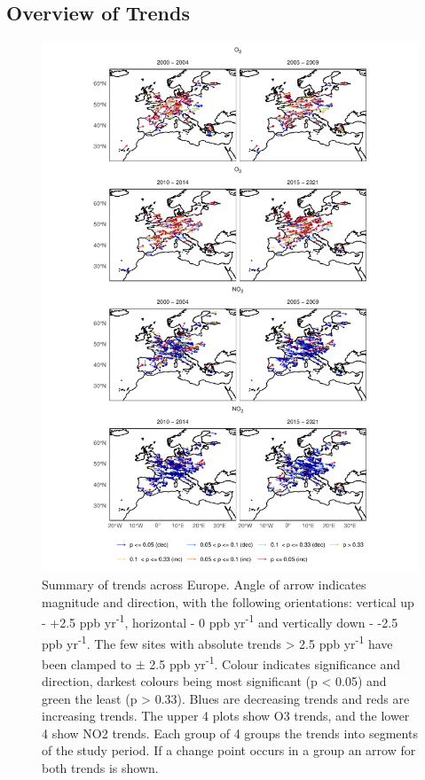 \documentclass[journal abbreviation, manuscript]{copernicus}
\begin{document}
\subsection{Overview of Trends} \label{sect:overview_of_trends}
\begin{figure}[p]
\includegraphics[width=12cm]{figures/f3_eu_arrows.pdf}
\caption{Summary of trends across Europe. Angle of arrow indicates magnitude and direction, with the following orientations: vertical up - +2.5 ppb yr\textsuperscript{-1}, horizontal - 0 ppb yr\textsuperscript{-1} and vertically down - -2.5 ppb yr\textsuperscript{-1}. The few sites with absolute trends > 2.5 ppb yr\textsuperscript{-1} have been clamped to $\pm$ 2.5 ppb yr\textsuperscript{-1}. Colour indicates significance and direction, darkest colours being most significant (p < 0.05) and green the least (p > 0.33). Blues are decreasing trends and reds are increasing trends. The upper 4 plots show O3 trends, and the lower 4 show NO2 trends. Each group of 4 groups the trends into segments of the study period. If a change point occurs in a group an arrow for both trends is shown.}

\label{fig:arrow_eu}
\end{figure}
\end{document}
